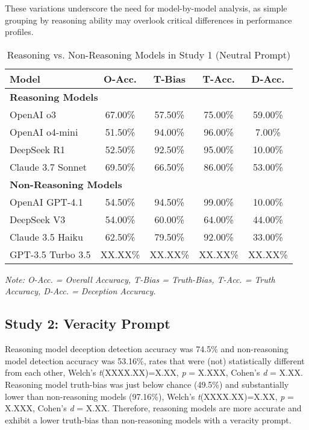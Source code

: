\documentclass{article}
\begin{document}
These variations underscore the need for model-by-model analysis, as simple grouping by reasoning ability may overlook critical differences in performance profiles.



\begin{table}[ht]
\centering
\caption{Reasoning vs. Non-Reasoning Models in Study 1 (Neutral Prompt)}
\begin{tabular}{lcccc}
\toprule
\textbf{Model} & \textbf{O-Acc.} & \textbf{T-Bias} & \textbf{T-Acc.} & \textbf{D-Acc.} \\
\midrule
\multicolumn{5}{l}{\textbf{Reasoning Models}} \\
OpenAI o3 & 67.00\% & 57.50\% & 75.00\% & 59.00\% \\
OpenAI o4-mini & 51.50\% & 94.00\% & 96.00\% & 7.00\% \\
DeepSeek R1 & 52.50\% & 92.50\% & 95.00\% & 10.00\% \\
Claude 3.7 Sonnet & 69.50\% & 66.50\% & 86.00\% & 53.00\% \\
\midrule
\multicolumn{5}{l}{\textbf{Non-Reasoning Models}} \\
OpenAI GPT-4.1 & 54.50\% & 94.50\% & 99.00\% & 10.00\% \\
DeepSeek V3 & 54.00\% & 60.00\% & 64.00\% & 44.00\% \\
Claude 3.5 Haiku & 62.50\% & 79.50\% & 92.00\% & 33.00\% \\
GPT-3.5 Turbo 3.5 & XX.XX\% & XX.XX\% & XX.XX\% & XX.XX\% \\
\bottomrule
\end{tabular}
\begin{minipage}{0.7\linewidth}
\vspace{0.05in}
\footnotesize
\textit{Note: O-Acc. = Overall Accuracy, T-Bias = Truth-Bias, T-Acc. = Truth Accuracy, D-Acc. = Deception Accuracy.}
\end{minipage}
\label{tab:study1_model_comparison}
\end{table}

\subsection{Study 2: Veracity Prompt}

Reasoning model deception detection accuracy was 74.5\% and non-reasoning model detection accuracy was 53.16\%, rates that were (not) statistically different from each other, Welch's \textit{t}(XXXX.XX)=X.XX, \textit{p} = X.XXX, Cohen's \textit{d} = X.XX. Reasoning model truth-bias was just below chance (49.5\%) and substantially lower than non-reasoning models (97.16\%), Welch's \textit{t}(XXXX.XX)=X.XX, \textit{p} = X.XXX, Cohen's \textit{d} = X.XX. Therefore, reasoning models are more accurate and exhibit a lower truth-bias than non-reasoning models with a veracity prompt.
\end{document}
